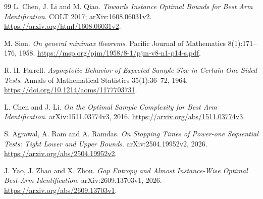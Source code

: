 \begin{thebibliography}{99}
 L. Chen, J. Li and M. Qiao.
\emph{Towards Instance Optimal Bounds for Best Arm Identification}.
COLT 2017; arXiv:1608.06031v2.
\url{https://arxiv.org/html/1608.06031v2}.

 M. Sion.
\emph{On general minimax theorems}.
Pacific Journal of Mathematics 8(1):171--176, 1958.
\url{https://msp.org/pjm/1958/8-1/pjm-v8-n1-p14-s.pdf}.

 R. H. Farrell.
\emph{Asymptotic Behavior of Expected Sample Size in Certain One Sided Tests}.
Annals of Mathematical Statistics 35(1):36--72, 1964.
\url{https://doi.org/10.1214/aoms/1177703731}.

 L. Chen and J. Li.
\emph{On the Optimal Sample Complexity for Best Arm Identification}.
arXiv:1511.03774v3, 2016.
\url{https://arxiv.org/abs/1511.03774v3}.

 S. Agrawal, A. Ram and A. Ramdas.
\emph{On Stopping Times of Power-one Sequential Tests: Tight Lower and Upper Bounds}.
arXiv:2504.19952v2, 2026.
\url{https://arxiv.org/abs/2504.19952v2}.

 J. Yao, J. Zhao and X. Zhou.
\emph{Gap Entropy and Almost Instance-Wise Optimal Best-Arm Identification}.
arXiv:2609.13703v1, 2026.
\url{https://arxiv.org/abs/2609.13703v1}.

\end{thebibliography}

